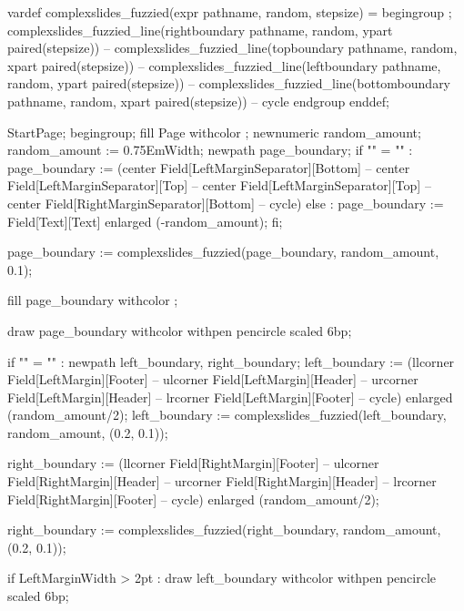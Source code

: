   vardef complexslides_fuzzied(expr pathname, random, stepsize) =
     begingroup ;
           complexslides_fuzzied_line(rightboundary  pathname, random, ypart paired(stepsize))
        -- complexslides_fuzzied_line(topboundary    pathname, random, xpart paired(stepsize))
        -- complexslides_fuzzied_line(leftboundary   pathname, random, ypart paired(stepsize))
        -- complexslides_fuzzied_line(bottomboundary pathname, random, xpart paired(stepsize))
        -- cycle
     endgroup
  enddef;
\stopMPdefinitions

  StartPage;
  begingroup;
  fill Page withcolor ;
  newnumeric random_amount; random_amount := 0.75EmWidth;
  newpath page_boundary; 
  if "\currentmakeup" = "" :
      page_boundary := (center Field[LeftMarginSeparator][Bottom]
                     -- center Field[LeftMarginSeparator][Top]
                     -- center Field[LeftMarginSeparator][Top]
                     -- center  Field[RightMarginSeparator][Bottom]
                     -- cycle)
  else :
      page_boundary := Field[Text][Text] enlarged (-random_amount);
  fi;

  page_boundary := complexslides_fuzzied(page_boundary, random_amount, 0.1);

  fill page_boundary withcolor ;

  draw page_boundary withcolor  
       withpen pencircle scaled 6bp;

  if "\currentmakeup" = "" :
     newpath left_boundary, right_boundary;
      left_boundary := (llcorner Field[LeftMargin][Footer]
                     -- ulcorner Field[LeftMargin][Header]
                     -- urcorner Field[LeftMargin][Header]
                     -- lrcorner Field[LeftMargin][Footer]
                     -- cycle)
                     enlarged (random_amount/2);
      left_boundary  := complexslides_fuzzied(left_boundary, random_amount, (0.2, 0.1));

      right_boundary := (llcorner Field[RightMargin][Footer]
                      -- ulcorner Field[RightMargin][Header]
                      -- urcorner Field[RightMargin][Header]
                      -- lrcorner Field[RightMargin][Footer]
                      -- cycle)
                      enlarged (random_amount/2);

      right_boundary := complexslides_fuzzied(right_boundary, random_amount, (0.2, 0.1));
      
     if LeftMarginWidth > 2pt :
        draw left_boundary 
           withcolor 
           withpen pencircle scaled 6bp;

